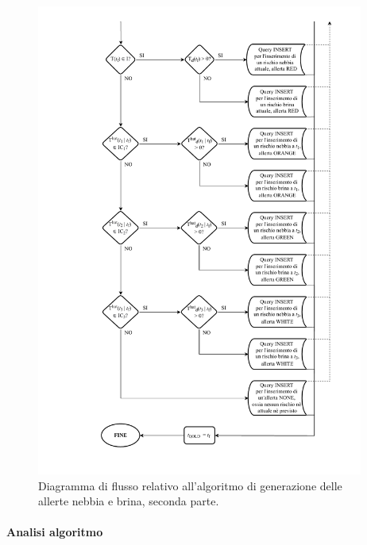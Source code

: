 \begin{figure}[h!]
	\centering
	\includegraphics[height=590px]{./Iterazione 3/OtherFiles/FC - Generatore allerte F&F(2).pdf}
	\caption{Diagramma di flusso relativo all'algoritmo di generazione delle allerte nebbia e brina, seconda parte.}
	\label{fig:FFFlowChart2}
\end{figure}

\clearpage

\paragraph{Analisi algoritmo}

